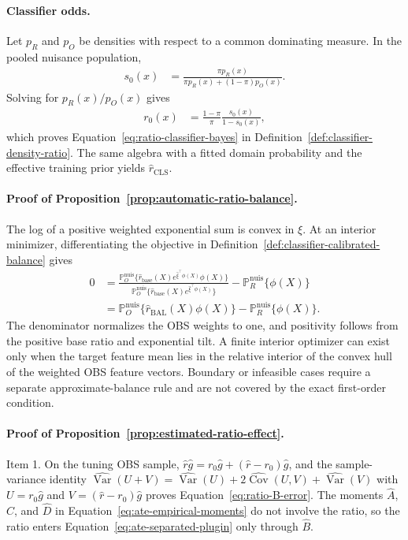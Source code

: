 \paragraph{Classifier odds.}
Let $p_R$ and $p_O$ be densities with respect to a common dominating
measure. In the pooled nuisance population,
\begin{align*}
s_0(x)
&=
\frac{\pi p_R(x)}{\pi p_R(x)+(1-\pi)p_O(x)}.
\end{align*}
Solving for $p_R(x)/p_O(x)$ gives
\begin{align*}
r_0(x)
&=
\frac{1-\pi}{\pi}\frac{s_0(x)}{1-s_0(x)},
\end{align*}
which proves Equation~\eqref{eq:ratio-classifier-bayes} in
Definition~\ref{def:classifier-density-ratio}. The same algebra with a fitted
domain probability and the effective training prior yields
$\widehat r_{\mathrm{CLS}}$.

\paragraph{Proof of Proposition~\ref{prop:automatic-ratio-balance}.}
The log of a positive weighted exponential sum is convex in $\xi$. At an
interior minimizer, differentiating the objective in
Definition~\ref{def:classifier-calibrated-balance} gives
\begin{align*}
0
&=
\frac{
\mathbb P_O^{\mathrm{nuis}}
\{\widehat r_{\mathrm{base}}(X)e^{\widehat\xi^\top\phi(X)}\phi(X)\}
}{
\mathbb P_O^{\mathrm{nuis}}
\{\widehat r_{\mathrm{base}}(X)e^{\widehat\xi^\top\phi(X)}\}
}
-\mathbb P_R^{\mathrm{nuis}}\{\phi(X)\}
\\
&=
\mathbb P_O^{\mathrm{nuis}}
\{\widehat r_{\mathrm{BAL}}(X)\phi(X)\}
-\mathbb P_R^{\mathrm{nuis}}\{\phi(X)\}.
\end{align*}
The denominator normalizes the OBS weights to one, and positivity follows from
the positive base ratio and exponential tilt. A finite interior optimizer can
exist only when the target feature mean lies in the relative interior of the
convex hull of the weighted OBS feature vectors. Boundary or infeasible cases require a separate
approximate-balance rule and are not covered by the exact first-order
condition.


\paragraph{Proof of Proposition~\ref{prop:estimated-ratio-effect}.}
Item 1. On the tuning OBS sample, $\widehat r\widehat g=r_0\widehat g+(\widehat r-r_0)\widehat g$, and the sample-variance identity $\widehat{\operatorname{Var}}(U+V)=\widehat{\operatorname{Var}}(U)+2\widehat{\operatorname{Cov}}(U,V)+\widehat{\operatorname{Var}}(V)$ with $U=r_0\widehat g$ and $V=(\widehat r-r_0)\widehat g$ proves Equation~\eqref{eq:ratio-B-error}. The moments $\widehat A$, $\widehat C$, and $\widehat D$ in Equation~\eqref{eq:ate-empirical-moments} do not involve the ratio, so the ratio enters Equation~\eqref{eq:ate-separated-plugin} only through $\widehat B$.

